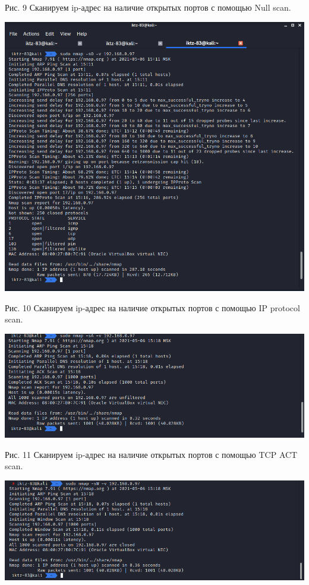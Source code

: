 \documentclass[a4paper,14pt]{extarticle}
\begin{document}
\begin{center}
        Рис. 9 Сканируем ip-адрес на наличие открытых портов с помощью Null scan.
        \vspace{1ex}

        \includegraphics[scale=0.5]{pics/9.png}

        Рис. 10 Сканируем ip-адрес на наличие открытых портов с помощью IP protocol scan.
        \vspace{1ex}

        \includegraphics[scale=0.5]{pics/10.png}

        Рис. 11 Сканируем ip-адрес на наличие открытых портов с помощью TCP ACT scan.
        \vspace{1ex}

        \includegraphics[scale=0.5]{pics/11.png}


\end{center}
\end{document}
